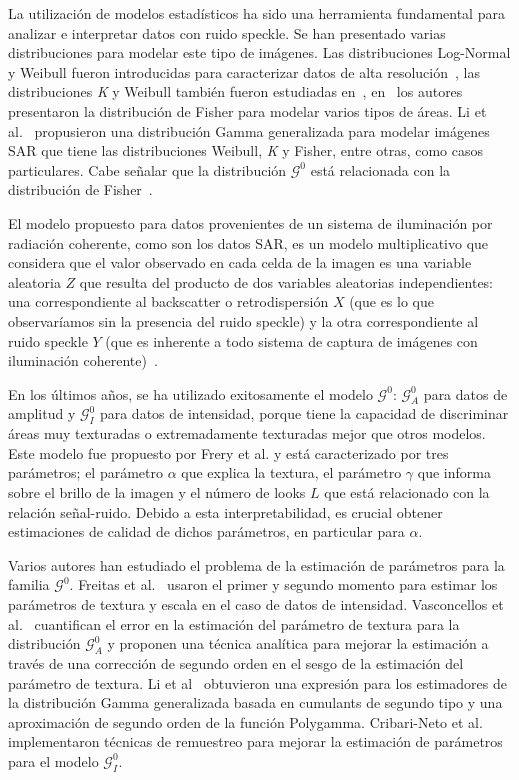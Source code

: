 La utilización de modelos estadísticos ha sido una herramienta fundamental para analizar e interpretar datos con ruido speckle. Se han presentado varias distribuciones para modelar este tipo de imágenes. Las distribuciones Log-Normal y Weibull fueron introducidas para caracterizar datos de alta resolución~\cite{oliverquegan98}, las distribuciones \textit{K} y Weibull también fueron estudiadas en~\cite{Oliver1993}, en~\cite{Tison2004} los autores presentaron la distribución de Fisher para modelar varios tipos de áreas. Li et al.~\cite{Li2011} propusieron una distribución Gamma generalizada para modelar imágenes SAR que tiene las distribuciones Weibull, \textit{K} y Fisher, entre otras, como casos particulares. Cabe señalar que la distribución $\mathcal{G}^0$ está relacionada con la distribución de Fisher~\cite{MejailJacoboFreryBustos:IJRS}.

El modelo propuesto para datos provenientes de un sistema de iluminación por radiación coherente, como son los datos SAR, es un modelo multiplicativo que considera que el valor observado en cada celda de la imagen es una variable aleatoria $Z$ que resulta del producto de dos variables aleatorias independientes: una correspondiente al backscatter o retrodispersión $X$ (que es lo que observaríamos sin la presencia del ruido speckle) y la otra correspondiente al ruido speckle $Y$ (que es inherente a todo sistema de captura de imágenes con iluminación coherente)~\cite{oliverquegan98}. 

En los últimos años, se ha utilizado exitosamente el modelo $\mathcal{G}^0$: $\mathcal{G}_A^0$ para datos de amplitud y $\mathcal G_I^0$ para datos de intensidad, porque tiene la capacidad de discriminar áreas muy texturadas o extremadamente texturadas mejor que otros modelos. Este modelo fue propuesto por Frery et al. \cite{Frery97} y está caracterizado por tres parámetros; el parámetro $\alpha$ que explica la textura, el parámetro $\gamma $ que informa sobre el brillo de la imagen y el número de looks $L$ que está relacionado con la relación señal-ruido.
Debido a esta interpretabilidad, es crucial obtener estimaciones de calidad de dichos parámetros, en particular para $\alpha$.

Varios autores han estudiado el problema de la estimación de parámetros para la familia $\mathcal G^0$. Freitas et al.~\cite{Freitas2005} usaron el primer y segundo momento para estimar los parámetros de textura y escala en el caso de datos de intensidad.
Vasconcellos et al.~\cite{VasconcellosFrerySilva:CompStat} cuantifican el error en la estimación del parámetro de textura para la distribución $\mathcal G_A^0$ y proponen una técnica analítica para mejorar la estimación a través de una corrección de segundo orden en el sesgo de la estimación del parámetro de textura. Li et al~\cite{Li2011} obtuvieron una expresión para los estimadores de la distribución Gamma generalizada basada en cumulants de segundo tipo y una aproximación de segundo orden de la función Polygamma. Cribari-Neto et al.~\cite{CribariFrerySilva:CSDA} implementaron técnicas de remuestreo para mejorar la estimación de parámetros para el modelo $\mathcal G_I^0$.

